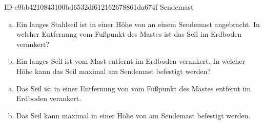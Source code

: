 \begin{exercise}
      {ID-e9bb4210843100bd6532df612162678861da674f}
      {Sendemast}
  \ifproblem\problem\par
    \begin{enumerate}[a)]
      \item Ein  langes Stahlseil ist in einer Höhe von 
            an einem Sendemast angebracht. In welcher Entfernung vom Fußpunkt des
            Mastes ist das Seil im Erdboden verankert?
      \item Ein  langes Seil ist  vom Mast entfernt im
            Erdboden verankert. In welcher Höhe kann das Seil maximal am Sendemast
            befestigt werden?
    \end{enumerate}
  \fi
  \ifoutcome\outcome\par
    \begin{enumerate}[a)]
      \item Das Seil ist in einer Entfernung von  vom Fußpunkt des
            Mastes entfernt im Erdboden verankert.
      \item Das Seil kann maximal in einer Höhe von  am Sendemast
            befestigt werden.
    \end{enumerate}
  \fi
\end{exercise}
